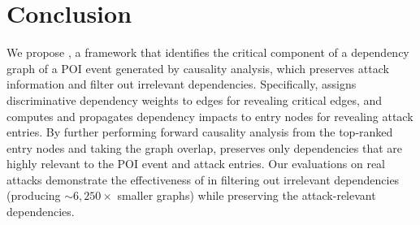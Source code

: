 \section{Conclusion}
We propose \tool, a framework that identifies the critical component of 
a dependency graph of a POI event generated by causality analysis, which preserves attack information and filter out irrelevant dependencies.
%
Specifically, \tool assigns discriminative dependency weights to edges for revealing critical edges, and computes and propagates dependency impacts to entry nodes for revealing attack entries. 
By further performing forward causality analysis from the top-ranked entry nodes and taking the graph overlap, \tool preserves only dependencies that are highly relevant to the POI event and attack entries.
Our evaluations on real attacks demonstrate the effectiveness of \tool in filtering out irrelevant dependencies (producing $\sim6,250\times$ smaller graphs) while preserving the attack-relevant dependencies.




